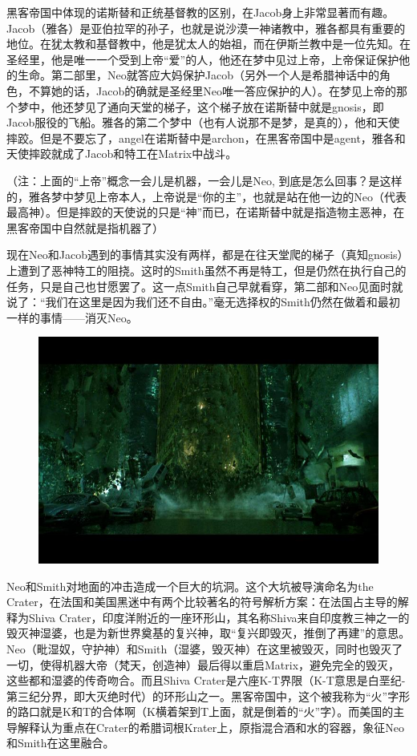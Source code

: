 \documentclass[UTF8]{ctexart}
\begin{document}
黑客帝国中体现的诺斯替和正统基督教的区别，在Jacob身上非常显著而有趣。Jacob（雅各）是亚伯拉罕的孙子，也就是说沙漠一神诸教中，雅各都具有重要的地位。在犹太教和基督教中，他是犹太人的始祖，而在伊斯兰教中是一位先知。在圣经里，他是唯一一个受到上帝“爱”的人，他还在梦中见过上帝，上帝保证保护他的生命。第二部里，Neo就答应大妈保护Jacob（另外一个人是希腊神话中的角色，不算她的话，Jacob的确就是圣经里Neo唯一答应保护的人）。在梦见上帝的那个梦中，他还梦见了通向天堂的梯子，这个梯子放在诺斯替中就是gnosis，即Jacob服役的飞船。雅各的第二个梦中（也有人说那不是梦，是真的），他和天使摔跤。但是不要忘了，angel在诺斯替中是archon，在黑客帝国中是agent，雅各和天使摔跤就成了Jacob和特工在Matrix中战斗。

（注：上面的“上帝”概念一会儿是机器，一会儿是Neo, 到底是怎么回事？是这样的，雅各梦中梦见上帝本人，上帝说是“你的主”，也就是站在他一边的Neo（代表最高神）。但是摔跤的天使说的只是“神”而已，在诺斯替中就是指造物主恶神，在黑客帝国中自然就是指机器了）

现在Neo和Jacob遇到的事情其实没有两样，都是在往天堂爬的梯子（真知gnosis）上遭到了恶神特工的阻挠。这时的Smith虽然不再是特工，但是仍然在执行自己的任务，只是自己也甘愿罢了。这一点Smith自己早就看穿，第二部和Neo见面时就说了：“我们在这里是因为我们还不自由。”毫无选择权的Smith仍然在做着和最初一样的事情——消灭Neo。

\begin{figure}[htb]
\centering
\includegraphics[width=0.5\linewidth]{fig/2c634b90158ee58ea977a490.jpg}
\end{figure}

Neo和Smith对地面的冲击造成一个巨大的坑洞。这个大坑被导演命名为the Crater，在法国和美国黑迷中有两个比较著名的符号解析方案：在法国占主导的解释为Shiva Crater，印度洋附近的一座环形山，其名称Shiva来自印度教三神之一的毁灭神湿婆，也是为新世界奠基的复兴神，取“复兴即毁灭，推倒了再建”的意思。Neo（毗湿奴，守护神）和Smith（湿婆，毁灭神）在这里被毁灭，同时也毁灭了一切，使得机器大帝（梵天，创造神）最后得以重启Matrix，避免完全的毁灭，这些都和湿婆的传奇吻合。而且Shiva Crater是六座K-T界限（K-T意思是白垩纪-第三纪分界，即大灭绝时代）的环形山之一。黑客帝国中，这个被我称为“火”字形的路口就是K和T的合体啊（K横着架到T上面，就是倒着的“火”字）。而美国的主导解释认为重点在Crater的希腊词根Krater上，原指混合酒和水的容器，象征Neo和Smith在这里融合。
\end{document}

